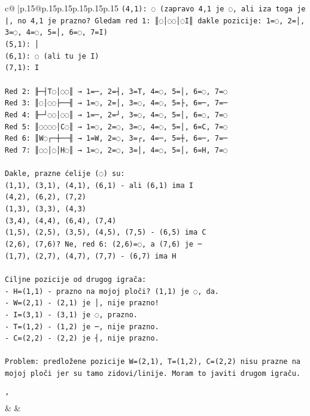 \documentclass{article}
\begin{document}
{\begin{supertabular}{c@{$\;$}|p{.15\linewidth}@{}p{.15\linewidth}p{.15\linewidth}p{.15\linewidth}p{.15\linewidth}p{.15\linewidth}}
{{{\texttt{(4,1): ◌ (zapravo 4,1 je ◌, ali iza toga je |, no 4,1 je prazno? Gledam red 1: ║◌│◌◌│◌I║ dakle pozicije: 1=◌, 2=│, 3=◌, 4=◌, 5=│, 6=◌, 7=I)} \\
\texttt{(5,1): │} \\
\texttt{(6,1): ◌ (ali tu je I)} \\
\texttt{(7,1): I} \\
\\ 
\texttt{Red 2: ╟─┤T◌│◌◌║ → 1=─, 2=┤, 3=T, 4=◌, 5=│, 6=◌, 7=◌} \\
\texttt{Red 3: ║◌│◌◌├──╢ → 1=◌, 2=│, 3=◌, 4=◌, 5=├, 6=─, 7=─} \\
\texttt{Red 4: ╟─┘◌◌│◌◌║ → 1=─, 2=┘, 3=◌, 4=◌, 5=│, 6=◌, 7=◌} \\
\texttt{Red 5: ║◌◌◌◌│C◌║ → 1=◌, 2=◌, 3=◌, 4=◌, 5=│, 6=C, 7=◌} \\
\texttt{Red 6: ║W◌┌─┼──╢ → 1=W, 2=◌, 3=┌, 4=─, 5=┼, 6=─, 7=─} \\
\texttt{Red 7: ║◌◌│◌│H◌║ → 1=◌, 2=◌, 3=│, 4=◌, 5=│, 6=H, 7=◌} \\
\\ 
\texttt{Dakle, prazne ćelije (◌) su:} \\
\texttt{(1,1), (3,1), (4,1), (6,1) {-} ali (6,1) ima I} \\
\texttt{(4,2), (6,2), (7,2)} \\
\texttt{(1,3), (3,3), (4,3)} \\
\texttt{(3,4), (4,4), (6,4), (7,4)} \\
\texttt{(1,5), (2,5), (3,5), (4,5), (7,5) {-} (6,5) ima C} \\
\texttt{(2,6), (7,6)? Ne, red 6: (2,6)=◌, a (7,6) je ─} \\
\texttt{(1,7), (2,7), (4,7), (7,7) {-} (6,7) ima H} \\
\\ 
\texttt{Ciljne pozicije od drugog igrača:} \\
\texttt{{-} H=(1,1) {-} prazno na mojoj ploči? (1,1) je ◌, da.} \\
\texttt{{-} W=(2,1) {-} (2,1) je │, nije prazno!} \\
\texttt{{-} I=(3,1) {-} (3,1) je ◌, prazno.} \\
\texttt{{-} T=(1,2) {-} (1,2) je ─, nije prazno.} \\
\texttt{{-} C=(2,2) {-} (2,2) je ┤, nije prazno.} \\
\\ 
\texttt{Problem: predložene pozicije W=(2,1), T=(1,2), C=(2,2) nisu prazne na mojoj ploči jer su tamo zidovi/linije. Moram to javiti drugom igraču.} \\
\\ 
\texttt{'} \\
            }
        }
    }
    & & \\ \\


\end{supertabular}}
\end{document}
